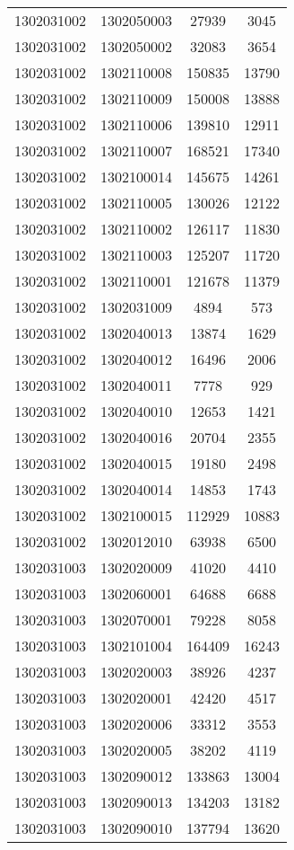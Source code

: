 \begin{longtable}{llcc}
1302031002 & 1302050003 & 27939 & 3045\\
1302031002 & 1302050002 & 32083 & 3654\\
1302031002 & 1302110008 & 150835 & 13790\\
1302031002 & 1302110009 & 150008 & 13888\\
1302031002 & 1302110006 & 139810 & 12911\\
1302031002 & 1302110007 & 168521 & 17340\\
1302031002 & 1302100014 & 145675 & 14261\\
1302031002 & 1302110005 & 130026 & 12122\\
1302031002 & 1302110002 & 126117 & 11830\\
1302031002 & 1302110003 & 125207 & 11720\\
1302031002 & 1302110001 & 121678 & 11379\\
1302031002 & 1302031009 & 4894 & 573\\
1302031002 & 1302040013 & 13874 & 1629\\
1302031002 & 1302040012 & 16496 & 2006\\
1302031002 & 1302040011 & 7778 & 929\\
1302031002 & 1302040010 & 12653 & 1421\\
1302031002 & 1302040016 & 20704 & 2355\\
1302031002 & 1302040015 & 19180 & 2498\\
1302031002 & 1302040014 & 14853 & 1743\\
1302031002 & 1302100015 & 112929 & 10883\\
1302031002 & 1302012010 & 63938 & 6500\\
1302031003 & 1302020009 & 41020 & 4410\\
1302031003 & 1302060001 & 64688 & 6688\\
1302031003 & 1302070001 & 79228 & 8058\\
1302031003 & 1302101004 & 164409 & 16243\\
1302031003 & 1302020003 & 38926 & 4237\\
1302031003 & 1302020001 & 42420 & 4517\\
1302031003 & 1302020006 & 33312 & 3553\\
1302031003 & 1302020005 & 38202 & 4119\\
1302031003 & 1302090012 & 133863 & 13004\\
1302031003 & 1302090013 & 134203 & 13182\\
1302031003 & 1302090010 & 137794 & 13620\\

\end{longtable}
